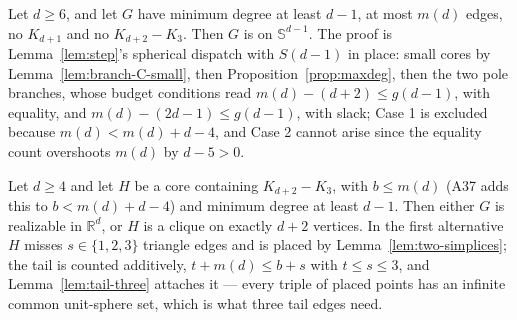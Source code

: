 \begin{lemma}[The spherical branch at $b = m(d)$]
  \label{lem:eq-core-spherical}
  \leanok
  Let $d \ge 6$, and let $G$ have minimum degree at least $d - 1$, at most $m(d)$ edges,
  no $K_{d+1}$ and no $K_{d+2} - K_3$. Then $G$ is on $\mathbb{S}^{d-1}$. The proof is
  Lemma~\ref{lem:step}'s spherical dispatch with $S(d-1)$ in place: small cores by
  Lemma~\ref{lem:branch-C-small}, then Proposition~\ref{prop:maxdeg}, then the two pole
  branches, whose budget conditions read $m(d) - (d+2) \le g(d-1)$, with equality, and
  $m(d) - (2d-1) \le g(d-1)$, with slack; Case 1 is
  excluded because $m(d) < m(d) + d - 4$, and Case 2 cannot arise since the equality count
  overshoots $m(d)$ by $d - 5 > 0$.
\end{lemma}

\begin{lemma}[Branch A at $b = m(d)$: place, or the core is complete]
  \label{lem:eq-branch-A}
  \leanok
  Let $d \ge 4$ and let $H$ be a core containing $K_{d+2} - K_3$, with
  $b \le m(d)$ (A37 adds this to $b < m(d) + d - 4$) and minimum degree at least $d - 1$.
  Then either $G$ is realizable in $\mathbb{R}^d$, or $H$ is a clique on exactly $d + 2$
  vertices. In the first alternative $H$ misses $s \in \{1, 2, 3\}$ triangle edges and is
  placed by Lemma~\ref{lem:two-simplices}; the tail is counted additively, $t + m(d) \le b + s$
  with $t \le s \le 3$, and Lemma~\ref{lem:tail-three} attaches it --- every triple of
  placed points has an infinite common unit-sphere set, which is what three tail edges need.
\end{lemma}

